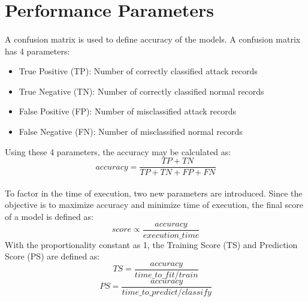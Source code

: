 \section{Performance Parameters}
\paragraph{}
A confusion matrix is used to define accuracy of the models. A confusion matrix has 4 parameters:
\begin{itemize}
    \item True Positive (TP): Number of correctly classified attack records
    \item True Negative (TN): Number of correctly classified normal records
    \item False Positive (FP): Number of misclassified attack records
    \item False Negative (FN): Number of misclassified normal records
\end{itemize}
Using these 4 parameters, the accuracy may be calculated as:
\begin{equation}
    accuracy = \frac {TP + TN} {TP + TN + FP + FN}
\end{equation}

\paragraph{}
To factor in the time of execution, two new parameters are introduced. Since the objective is to maximize accuracy and minimize time of execution, the final score of a model is defined as:
\begin{equation}
    score \propto \frac {accuracy} {execution\_time}
\end{equation}
With the proportionality constant as 1, the Training Score (TS) and Prediction Score (PS) are defined as:
\begin{equation}
    TS = \frac {accuracy} {time\_to\_fit/train}
\end{equation}
\begin{equation}
    PS = \frac {accuracy} {time\_to\_predict/classify}
\end{equation}
